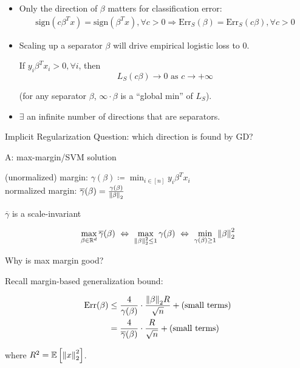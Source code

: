 \begin{itemize}
    \item Only the direction of \(\beta\) matters for classification error: 
    \begin{align*}
     \text{sign} \left(  c \beta^T x \right) = \text{sign} \left(\beta^T x\right), \forall c > 0 
     \Rightarrow \text{Err}_S (\beta) = \text{Err}_S (c \beta), \forall c > 0 
    \end{align*}

    \item Scaling up a separator \(\beta\) will drive empirical logistic loss to 0. 
    
    If \(y_i \beta^T x_i > 0, \forall i\), then 
    \[
        L_S (c \beta) \to 0 \text{ as } c \to + \infty   
    \]

    (for any separator \(\beta\), \(\infty \cdot \beta\) is a ``global min'' of \(L_S\)). 

    \item \(\exists\) an infinite number of directions that are separators. 
\end{itemize}

Implicit Regularization Question: which direction is found by GD? 

A: max-margin/SVM solution 


\begin{definition}
    (unormalized) margin: \(\gamma (\beta) \coloneqq \min_{i \in [n]} y_i \beta^T x_i\)  \\ 
    normalized margin: \(\overline{\gamma}(\beta) = \frac{\gamma (\beta)}{\norm{\beta}_2}\) 
\end{definition}

\begin{remark}
    \(\overline{\gamma}\) is a scale-invariant 
\end{remark}

\begin{definition}
    \begin{align*}
        \max_{\beta \in \R^d} \overline{\gamma} (\beta) \ \Leftrightarrow \ \max_{\norm{\beta}_2^2 \leq 1} 
        \gamma (\beta) \ \Leftrightarrow \ \min_{\gamma (\beta) \geq 1} \norm{\beta}_2^2  
    \end{align*}
\end{definition}

\begin{remark}
    Why is max margin good? 

    Recall margin-based generalization bound: 

    \begin{align*}
        \text{Err} (\beta) &\leq \frac{4}{\gamma (\beta)} \cdot \frac{\norm{\beta}_2 R}{\sqrt{n}}
        + (\text{small terms}) \\ 
        &= \frac{4}{\overline{\gamma}(\beta)} \cdot \frac{R}{\sqrt{n}} + (\text{small terms})
    \end{align*}

    where \(R^2 = \mathbb{E} \left[ \norm{x}_2^2 \right]\). 
\end{remark}

